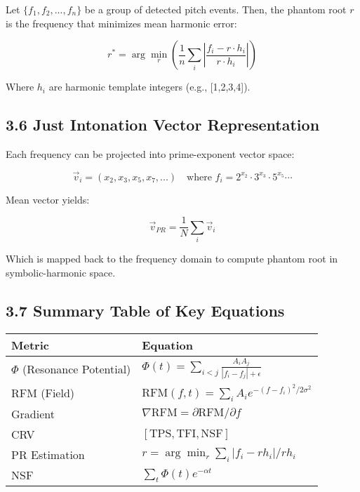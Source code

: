 \documentclass[10pt]{article}
\begin{document}
Let $\{f_1, f_2, ..., f_n\}$ be a group of detected pitch events. Then, the phantom root $r$ is the frequency that minimizes mean harmonic error:

\begin{equation}
r^* = \arg\min_r \left( \frac{1}{n} \sum_i \left| \frac{f_i - r \cdot h_i}{r \cdot h_i} \right| \right)
\end{equation}

Where $h_i$ are harmonic template integers (e.g., [1,2,3,4]).

\subsection*{3.6 Just Intonation Vector Representation}

Each frequency can be projected into prime-exponent vector space:

\begin{equation}
\vec{v}_i = (x_2, x_3, x_5, x_7, ...)
\quad \text{where } f_i = 2^{x_2} \cdot 3^{x_3} \cdot 5^{x_5} \cdots
\end{equation}

Mean vector yields:

\begin{equation}
\vec{v}_{PR} = \frac{1}{N} \sum_i \vec{v}_i
\end{equation}

Which is mapped back to the frequency domain to compute phantom root in symbolic-harmonic space.

\subsection*{3.7 Summary Table of Key Equations}

\begin{center}
\begin{tabular}{|l|p{9cm}|}
\hline
\textbf{Metric} & \textbf{Equation} \\\hline
$\Phi$ (Resonance Potential) & $\Phi(t) = \sum_{i<j} \frac{A_i A_j}{|f_i - f_j| + \epsilon}$ \\\hline
RFM (Field) & $\text{RFM}(f, t) = \sum_i A_i e^{-(f - f_i)^2 / 2\sigma^2}$ \\\hline
Gradient & $\nabla \text{RFM} = \partial \text{RFM} / \partial f$ \\\hline
CRV & $[\text{TPS}, \text{TFI}, \text{NSF}]$ \\\hline
PR Estimation & $r = \arg\min_r \sum_i |f_i - r h_i| / r h_i$ \\\hline
NSF & $\sum_t \Phi(t) e^{-\alpha t}$ \\\hline
\end{tabular}
\end{center}
\end{document}
